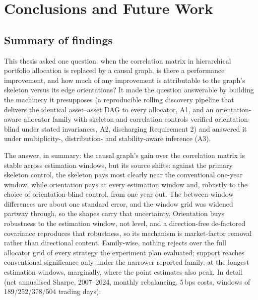 \chapter{Conclusions and Future Work}
\label{chap:conclusion}

\section{Summary of findings}
\label{sec:summary}

This thesis asked one question: when the correlation matrix in
hierarchical portfolio allocation is replaced by a causal graph, is
there a performance improvement, and how much of any improvement is
attributable to the graph's skeleton
versus its edge orientations? It made the question answerable by building
the
machinery it presupposes (a reproducible rolling discovery pipeline that
delivers the identical asset--asset DAG to every allocator, A1, and an
orientation-aware allocator family with skeleton and correlation controls
verified orientation-blind under stated invariances, A2, discharging
Requirement 2) and answered
it under multiplicity-, distribution- and stability-aware inference (A3).

The answer, in summary: the causal graph's gain over the
correlation matrix is stable across estimation windows, but its source
shifts: against the primary skeleton control, the skeleton pays most
clearly near the conventional one-year window, while orientation pays at
every estimation window and, robustly to the choice of orientation-blind control,
from one year out. The between-window differences are about one standard
error, and the window grid was widened partway through, so the shapes
carry that uncertainty. Orientation buys robustness to the estimation
window, not level, and a direction-free de-factored covariance
reproduces that robustness, so its mechanism is market-factor removal
rather than directional content. Family-wise, nothing rejects over the
full allocator grid of every strategy the experiment plan evaluated;
support reaches conventional significance
only under the narrower reported family, at the longest estimation windows,
marginally, where the point estimates also peak. In detail (net annualised Sharpe, 2007--2024,
monthly
rebalancing, 5\,bps costs, windows of 189/252/378/504 trading days):

